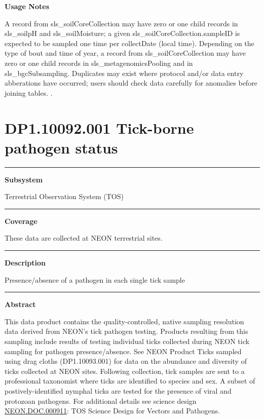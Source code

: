 \documentclass[]{article}
\begin{document}
\textbf{Usage Notes}

A record from sls\_soilCoreCollection may have zero or one child records
in sls\_soilpH and sls\_soilMoisture; a given
sls\_soilCoreCollection.sampleID is expected to be sampled one time per
collectDate (local time). Depending on the type of bout and time of
year, a record from sls\_soilCoreCollection may have zero or one child
records in sls\_metagenomicsPooling and in sls\_bgcSubsampling.
Duplicates may exist where protocol and/or data entry abberations have
occurred; users should check data carefully for anomalies before joining
tables. \newpage
.

\section{DP1.10092.001 Tick-borne pathogen
status}\label{dp1.10092.001-tick-borne-pathogen-status}

\begin{center}\rule{0.5\linewidth}{\linethickness}\end{center}

\textbf{Subsystem}

Terrestrial Observation System (TOS)

\begin{center}\rule{0.5\linewidth}{\linethickness}\end{center}

\textbf{Coverage}

These data are collected at NEON terrestrial sites.

\begin{center}\rule{0.5\linewidth}{\linethickness}\end{center}

\textbf{Description}

Presence/absence of a pathogen in each single tick sample

\begin{center}\rule{0.5\linewidth}{\linethickness}\end{center}

\textbf{Abstract}

This data product contains the quality-controlled, native sampling
resolution data derived from NEON's tick pathogen testing. Products
resulting from this sampling include results of testing individual ticks
collected during NEON tick sampling for pathogen presence/absence. See
NEON Product Ticks sampled using drag cloths (DP1.10093.001) for data on
the abundance and diversity of ticks collected at NEON sites. Following
collection, tick samples are sent to a professional taxonomist where
ticks are identified to species and sex. A subset of
postively-identified nymphal ticks are tested for the presence of viral
and protozoan pathogens. For additional details see science design
\href{http://data.neonscience.org/api/v0/documents/NEON.DOC.000911vA}{NEON.DOC.000911}:
TOS Science Design for Vectors and Pathogens.
\end{document}

